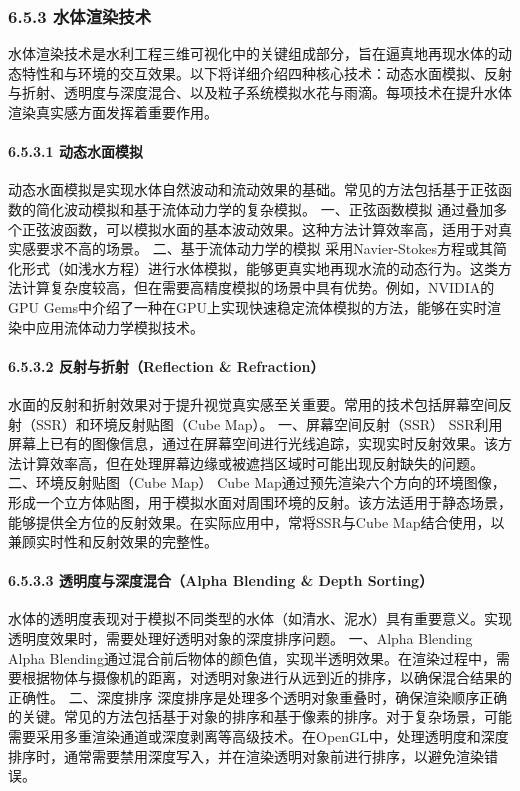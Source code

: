 {{{{{{{{{{\subsubsection{6.5.3 水体渲染技术}\label{ux6c34ux4f53ux6e32ux67d3ux6280ux672f}
水体渲染技术是水利工程三维可视化中的关键组成部分，旨在逼真地再现水体的动态特性和与环境的交互效果。以下将详细介绍四种核心技术：动态水面模拟、反射与折射、透明度与深度混合、以及粒子系统模拟水花与雨滴。每项技术在提升水体渲染真实感方面发挥着重要作用。
\paragraph{6.5.3.1 动态水面模拟}\label{ux52a8ux6001ux6c34ux9762ux6a21ux62df}
动态水面模拟是实现水体自然波动和流动效果的基础。常见的方法包括基于正弦函数的简化波动模拟和基于流体动力学的复杂模拟。 一、正弦函数模拟 通过叠加多个正弦波函数，可以模拟水面的基本波动效果。这种方法计算效率高，适用于对真实感要求不高的场景。
二、基于流体动力学的模拟 采用Navier-Stokes方程或其简化形式（如浅水方程）进行水体模拟，能够更真实地再现水流的动态行为。这类方法计算复杂度较高，但在需要高精度模拟的场景中具有优势。例如，NVIDIA的GPU
Gems中介绍了一种在GPU上实现快速稳定流体模拟的方法，能够在实时渲染中应用流体动力学模拟技术。 \paragraph{6.5.3.2 反射与折射（Reflection \&
Refraction）}\label{ux53cdux5c04ux4e0eux6298ux5c04reflection-refraction}
水面的反射和折射效果对于提升视觉真实感至关重要。常用的技术包括屏幕空间反射（SSR）和环境反射贴图（Cube Map）。 一、屏幕空间反射（SSR）
SSR利用屏幕上已有的图像信息，通过在屏幕空间进行光线追踪，实现实时反射效果。该方法计算效率高，但在处理屏幕边缘或被遮挡区域时可能出现反射缺失的问题。 二、环境反射贴图（Cube Map） Cube
Map通过预先渲染六个方向的环境图像，形成一个立方体贴图，用于模拟水面对周围环境的反射。该方法适用于静态场景，能够提供全方位的反射效果。在实际应用中，常将SSR与Cube Map结合使用，以兼顾实时性和反射效果的完整性。
\paragraph{6.5.3.3 透明度与深度混合（Alpha Blending \& Depth
Sorting）}\label{ux900fux660eux5ea6ux4e0eux6df1ux5ea6ux6df7ux5408alpha-blending-depth-sorting}
水体的透明度表现对于模拟不同类型的水体（如清水、泥水）具有重要意义。实现透明度效果时，需要处理好透明对象的深度排序问题。 一、Alpha Blending Alpha
Blending通过混合前后物体的颜色值，实现半透明效果。在渲染过程中，需要根据物体与摄像机的距离，对透明对象进行从远到近的排序，以确保混合结果的正确性。 二、深度排序
深度排序是处理多个透明对象重叠时，确保渲染顺序正确的关键。常见的方法包括基于对象的排序和基于像素的排序。对于复杂场景，可能需要采用多重渲染通道或深度剥离等高级技术。在OpenGL中，处理透明度和深度排序时，通常需要禁用深度写入，并在渲染透明对象前进行排序，以避免渲染错误。
}}}}}}}}}}
